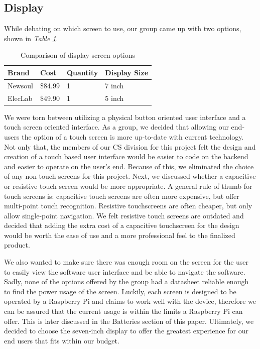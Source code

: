 \subsection{Display}

While debating on which screen to use, our group came up with two options, shown in \textit{Table \ref{Tab:display_brand}}.

\begin{table}[]
  \centering
  \begin{tabular}{|l|l|l|l|}
    \hline
    Brand   & Cost    & Quantity & Display Size \\ \hline
    Newsoul & \$84.99 & 1        & 7 inch       \\ \hline
    ElecLab & \$49.90 & 1        & 5 inch       \\ \hline
  \end{tabular}
  \caption{Comparison of display screen options}
  \label{Tab:display_brand}
\end{table}

We were torn between utilizing a physical button oriented user interface and a touch screen oriented interface. As a group, we decided that allowing our end-users the option of a touch screen is more up-to-date with current technology. Not only that, the members of our CS division for this project felt the design and creation of a touch based user interface would be easier to code on the backend and easier to operate on the user’s end. Because of this, we eliminated the choice of any non-touch screens for this project. Next, we discussed whether a capacitive or resistive touch screen would be more appropriate. A general rule of thumb for touch screens is: capacitive touch screens are often more expensive, but offer multi-point touch recognition. Resistive touchscreens are often cheaper, but only allow single-point navigation. We felt resistive touch screens are outdated and decided that adding the extra cost of a capacitive touchscreen for the design would be worth the ease of use and a more professional feel to the finalized product.

We also wanted to make sure there was enough room on the screen for the user to easily view the software user interface and be able to navigate the software. Sadly, none of the options offered by the group had a datasheet reliable enough to find the power usage of the screen. Luckily, each screen is designed to be operated by a Raspberry Pi and claims to work well with the device, therefore we can be assured that the current usage is within the limits a Raspberry Pi can offer. This is later discussed in the Batteries section of this paper. Ultimately, we decided to choose the seven-inch display to offer the greatest experience for our end users that fits within our budget.

